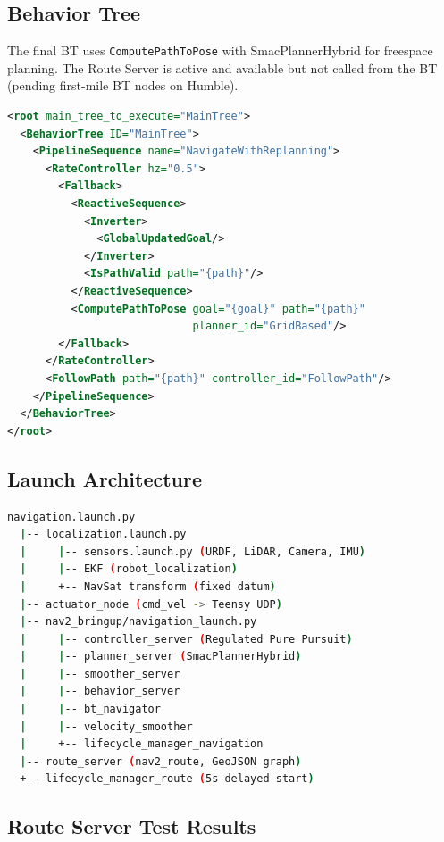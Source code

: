 \documentclass[11pt,a4paper]{article}
\begin{document}
\subsection{Behavior Tree}

The final BT uses \texttt{ComputePathToPose} with SmacPlannerHybrid for freespace planning. The Route Server is active and available but not called from the BT (pending first-mile BT nodes on Humble).

\begin{lstlisting}[language=XML,caption={navigate\_route\_graph.xml --- Final BT}]
<root main_tree_to_execute="MainTree">
  <BehaviorTree ID="MainTree">
    <PipelineSequence name="NavigateWithReplanning">
      <RateController hz="0.5">
        <Fallback>
          <ReactiveSequence>
            <Inverter>
              <GlobalUpdatedGoal/>
            </Inverter>
            <IsPathValid path="{path}"/>
          </ReactiveSequence>
          <ComputePathToPose goal="{goal}" path="{path}"
                             planner_id="GridBased"/>
        </Fallback>
      </RateController>
      <FollowPath path="{path}" controller_id="FollowPath"/>
    </PipelineSequence>
  </BehaviorTree>
</root>
\end{lstlisting}

\subsection{Launch Architecture}

\begin{lstlisting}[language=bash,caption={navigation.launch.py node hierarchy}]
navigation.launch.py
  |-- localization.launch.py
  |     |-- sensors.launch.py (URDF, LiDAR, Camera, IMU)
  |     |-- EKF (robot_localization)
  |     +-- NavSat transform (fixed datum)
  |-- actuator_node (cmd_vel -> Teensy UDP)
  |-- nav2_bringup/navigation_launch.py
  |     |-- controller_server (Regulated Pure Pursuit)
  |     |-- planner_server (SmacPlannerHybrid)
  |     |-- smoother_server
  |     |-- behavior_server
  |     |-- bt_navigator
  |     |-- velocity_smoother
  |     +-- lifecycle_manager_navigation
  |-- route_server (nav2_route, GeoJSON graph)
  +-- lifecycle_manager_route (5s delayed start)
\end{lstlisting}

\subsection{Route Server Test Results}
\end{document}
